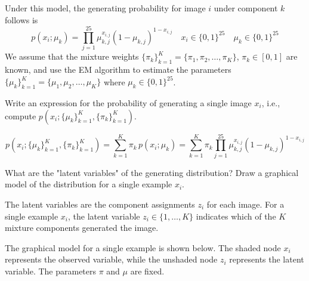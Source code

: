 \documentclass{article}
\begin{document}
\begin{probset}
\begin{prob}
    Under this model, the generating probability for image $i$ under component $k$ follows is
    \[
    p(x_i; \mu_k) = \prod_{j=1}^{25} \mu_{k,j}^{x_{i,j}} (1 - \mu_{k,j})^{1 - x_{i,j}} \quad x_i \in \{0, 1\}^{25} \quad \mu_k \in \{0, 1\}^{25}
    \]
    We assume that the mixture weights $\{\pi_k\}_{k=1}^K = \{\pi_1, \pi_2, \ldots, \pi_K\}$, $\pi_k \in [0, 1]$ are known, and use the EM algorithm to estimate the parameters $\{\mu_k\}_{k=1}^K = \{\mu_1, \mu_2, \ldots, \mu_K\}$ where $\mu_k \in \{0, 1\}^{25}$.

    \begin{subprobset}
        \begin{subprob}
            Write an expression for the probability of generating a single image $x_i$, i.e., compute \newline $p(x_i; \{\mu_k\}_{k=1}^K, \{\pi_k\}_{k=1}^K)$.

            \begin{soln}
                \[
                    p(x_i;\{\mu_k\}_{k=1}^K,\{\pi_k\}_{k=1}^K)
                    = \sum_{k=1}^K \pi_k \, p(x_i;\mu_k)
                    = \sum_{k=1}^K \pi_k \prod_{j=1}^{25} \mu_{k,j}^{x_{i,j}} (1 - \mu_{k,j})^{1 - x_{i,j}}
                \]
            \end{soln}
        \end{subprob}

        \begin{subprob}
            What are the "latent variables" of the generating distribution? Draw a graphical model of the distribution for a single example $x_i$.

            \begin{soln}
                The latent variables are the component assignments $z_i$ for each image. For a single example $x_i$, the latent variable $z_i \in \{1, \ldots, K\}$ indicates which of the $K$ mixture components generated the image.
            
                The graphical model for a single example is shown below. The shaded node $x_i$ represents the observed variable, while the unshaded node $z_i$ represents the latent variable. The parameters $\pi$ and $\mu$ are fixed.
            
                \begin{center}
\end{center}
\end{soln}
\end{subprob}
\end{subprobset}
\end{prob}
\end{probset}
\end{document}
